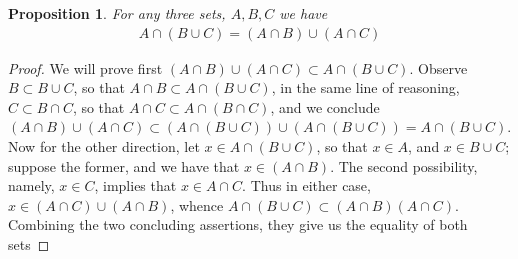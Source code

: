 \documentclass[11pt,a4paper]{article}
\newtheorem{claim}{Proposition}
\begin{document}
\begin{claim}
For any three sets, $A,B,C$ we have
\begin{align*}
A \cap \left( B \cup C \right) = \left( A \cap B \right) \cup \left( A \cap C \right)
\end{align*}
\end{claim}
\begin{proof}
We will prove first $ \left( A \cap B \right) \cup \left( A \cap C \right) \subset A \cap \left( B \cup C \right) $. Observe $ B \subset B \cup C$, so that $ A \cap B \subset A \cap \left( B \cup C \right) $, in the same line of reasoning, $C \subset B \cap C$, so that $ A \cap C \subset A \cap \left( B \cap C \right) $, and we conclude $ \left( A \cap B \right) \cup \left( A \cap C \right) \subset \left( A \cap \left( B \cup C \right) \right) \cup \left( A \cap \left( B \cup C \right) \right) = A \cap \left( B \cup C \right) $.
Now for the other direction, let $x \in A \cap (B \cup C)$, so that $x \in A$, and $x \in B \cup C$; suppose the former, and we have that $ x \in ( A \cap B ) $. The second possibility, namely, $x \in C$, implies that $x \in A \cap C $. Thus in either case, $ x \in  (A \cap C) \cup (A \cap B)  $, whence $ A \cap \left( B \cup C \right) \subset \left( A \cap B \right) \left( A \cap C \right)$.
Combining the two concluding assertions, they give us the equality of both sets
\end{proof}
\end{document}
